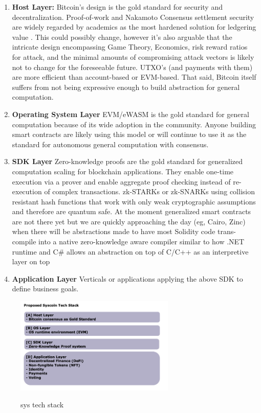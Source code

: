 \documentclass[peerreview]{ieeesyscoin}
\begin{document}
\begin{enumerate}
\item \textbf{Host Layer: }Bitcoin’s design is the gold standard for security and decentralization. Proof-of-work and Nakamoto Consensus settlement security are widely regarded by academics as the most hardened solution for ledgering value \cite{Bit15}. This could possibly change, however it's also arguable that the intricate design encompassing Game Theory, Economics, risk reward ratios for attack, and the minimal amounts of compromising attack vectors is likely not to change for the foreseeable future. UTXO’s (and payments with them) are more efficient than account-based or EVM-based. That said, Bitcoin itself suffers from not being expressive enough to build abstraction for general computation. 
\item \textbf{Operating System Layer} EVM/eWASM is the gold standard for general computation because of its wide adoption in the community. Anyone building smart contracts are likely using this model or will continue to use it as the standard for autonomous general computation with consensus.
\item \textbf{SDK Layer} Zero-knowledge proofs are the gold standard for generalized computation scaling for blockchain applications. They enable one-time execution via a prover and enable aggregate proof checking instead of re-execution of complex transactions. zk-STARKs or zk-SNARKs using collision resistant hash functions that work with only weak cryptographic assumptions and therefore are quantum safe. At the moment generalized smart contracts are not there yet but we are quickly approaching the day (eg, Cairo, Zinc) when there will be abstractions made to have most Solidity code trans-compile into a native zero-knowledge aware compiler similar to how .NET runtime and C\# allows an abstraction on top of C/C++ as an interpretive layer on top
\item \textbf{Application Layer} Verticals or applications applying the above SDK to define business goals. 
\end{enumerate}

\begin{figure}[h!]
\includegraphics[width=3in]{img/tech_stack.png}
\label{fig:tech_stack}
\caption{sys tech stack} 
\end{figure} 
\end{document}
